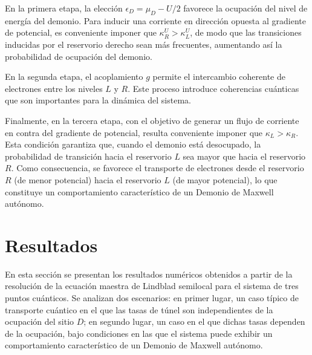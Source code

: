 En la primera etapa, la elección $\epsilon_D = \mu_D - U/2$ favorece la ocupación del nivel de energía del demonio. Para inducir una corriente en dirección opuesta al gradiente de potencial, es conveniente imponer que $\kappa^{U}_{R} > \kappa^{U}_{L}$, de modo que las transiciones inducidas por el reservorio derecho sean más frecuentes, aumentando así la probabilidad de ocupación del demonio.  


En la segunda etapa, el acoplamiento $g$ permite el intercambio coherente de electrones entre los niveles $L$ y $R$. Este proceso introduce coherencias cuánticas que son importantes para la dinámica del sistema.  


Finalmente, en la tercera etapa, con el objetivo de generar un flujo de corriente en contra del gradiente de potencial, resulta conveniente imponer que $\kappa_{L} > \kappa_{R}$. Esta condición garantiza que, cuando el demonio está desocupado, la probabilidad de transición hacia el reservorio $L$ sea mayor que hacia el reservorio $R$. Como consecuencia, se favorece el transporte de electrones desde el reservorio $R$ (de menor potencial) hacia el reservorio $L$ (de mayor potencial), lo que constituye un comportamiento característico de un Demonio de Maxwell autónomo.


\label{sec5:dem}

\newpage

\section{Resultados}
\label{resultados}
En esta sección se presentan los resultados numéricos obtenidos a partir de la resolución de la ecuación maestra de Lindblad semilocal para el sistema de tres puntos cuánticos. Se analizan dos escenarios: en primer lugar, un caso típico de transporte cuántico en el que las tasas de túnel son independientes de la ocupación del sitio $D$; en segundo lugar, un caso en el que dichas tasas dependen de la ocupación, bajo condiciones en las que el sistema puede exhibir un comportamiento característico de un Demonio de Maxwell autónomo.  

